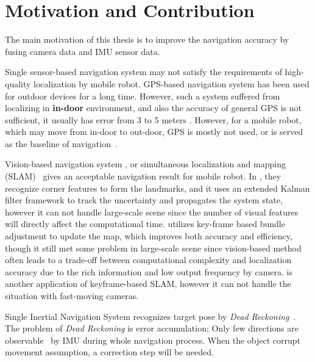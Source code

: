 \section{Motivation and Contribution}
\label{sec:motiv_contrib}

The main motivation of this thesis is to improve the navigation accuracy by fusing camera data and IMU sensor data. 

Single sensor-based navigation system may not satisfy the requirements of high-quality localization by mobile robot. GPS-based navigation system has been used for outdoor devices for a long time. However, such a system suffered from localizing in \textbf{in-door} environment, and also the accuracy of general GPS is not sufficient, it usually has error from 3 to 5 meters \cite{wiki:GPS}. However, for a mobile robot, which may move from in-door to out-door, GPS is mostly not used, or is served as the baseline of navigation~\cite{hesch2014consistency}.   

Vision-based navigation system \cite{davison2003real, klein2007parallel}, or simultaneous localization and mapping (SLAM)~\cite{davison2007monoslam, engel2014lsd, mur2015orb} gives an acceptable navigation result for mobile robot. In \cite{davison2003real}, they recognize corner features to form the landmarks, and it uses an extended Kalman filter framework to track the uncertainty and propagates the system state, however it can not handle large-scale scene since the number of visual features will directly affect the computational time. \cite{klein2007parallel} utilizes key-frame based bundle adjustment to update the map, which improves both accuracy and efficiency, though it still met some problem in large-scale scene since vision-based method often leads to a trade-off between computational complexity and localization accuracy due to the rich information and low output frequency by camera. \cite{mur2015orb} is another application of keyframe-based SLAM, however it can not handle the situation with fast-moving cameras.

Single Inertial Navigation System recognizes target pose by \textit{Dead Reckoning}~\cite{mcnaughton1991dead, levi1996dead}. The problem of \textit{Dead Reckoning} is error accumulation; Only few directions are observable~\cite{hesch2014consistency} by IMU during whole navigation process. When the object corrupt movement assumption, a correction step will be needed.


